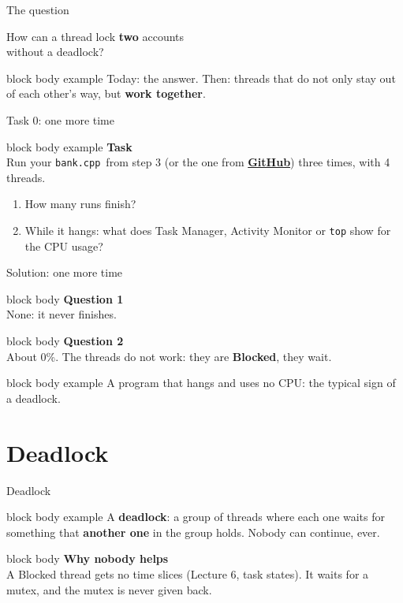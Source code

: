 \documentclass[aspectratio=169,10pt]{beamer}
\newcommand{\defbox}[1]{%
  \begin{beamercolorbox}[rounded=true,sep=0.1cm,wd=\linewidth]{block body example}
    \footnotesize #1
  \end{beamercolorbox}\vspace{0.06cm}}
\newcommand{\stepbox}[2]{%
  \begin{beamercolorbox}[rounded=true,sep=0.09cm,wd=\linewidth]{block body}
    \footnotesize\textbf{#1}\\ #2
  \end{beamercolorbox}\vspace{0.06cm}}
\newcommand{\taskhead}[2]{%
  \begin{beamercolorbox}[rounded=true,sep=0.12cm,wd=\linewidth]{block body example}
    \small\textbf{#1}\\[0.04cm]
    \footnotesize #2
  \end{beamercolorbox}\vspace{0.1cm}}
\newcommand{\keymsg}[1]{%
  \begin{beamercolorbox}[rounded=true,sep=0.1cm,wd=\textwidth]{block body example}
    \centering\footnotesize #1
  \end{beamercolorbox}}
\newcommand{\fileBank}{\texttt{bank.cpp}}
\newcommand{\ghlink}[1]{\href{https://github.com/KsaweryM/Computer-Hardware-Course/tree/main/Lecture_8_Deadlock_and_Cooperating_Threads/#1}{\textcolor{DeepBlue}{\textbf{GitHub}}}}
\begin{document}
\begin{frame}{The question}
  \vfill
  \begin{center}
    \Large How can a thread lock \textbf{two} accounts\\[0.2cm] without a deadlock?
  \end{center}
  \vfill
  \keymsg{Today: the answer. Then: threads that do not only stay out of each other's way, but \textbf{work together}.}
\end{frame}

\begin{frame}{Task 0: one more time}
  \taskhead{Task}{Run your \fileBank\ from step 3 (or the one from \ghlink{Task0}) three times, with 4 threads.}
  \footnotesize
  \begin{enumerate}\setlength{\itemsep}{6pt}
    \item How many runs finish?
    \item While it hangs: what does Task Manager, Activity Monitor or \texttt{top} show for the CPU usage?
  \end{enumerate}
\end{frame}

\begin{frame}{Solution: one more time}
  \vfill
  \stepbox{Question 1}{None: it never finishes.}
  \stepbox{Question 2}{About 0\%. The threads do not work: they are \textbf{Blocked}, they wait.}
  \vfill
  \keymsg{A program that hangs and uses no CPU: the typical sign of a deadlock.}
\end{frame}

\section{Deadlock}

\begin{frame}{Deadlock}
  \vfill
  \defbox{A \textbf{deadlock}: a group of threads where each one waits for something that \textbf{another one} in the group
    holds. Nobody can continue, ever.}
  \vfill
  \stepbox{Why nobody helps}{A Blocked thread gets no time slices (Lecture 6, task states). It waits for a mutex, and the
    mutex is never given back.}
  \vfill
\end{frame}
\end{document}
